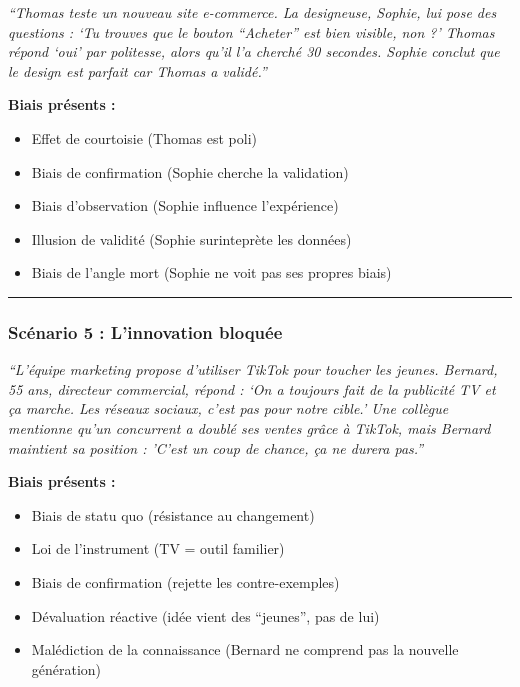 \documentclass[
]{article}
\providecommand{\tightlist}{%
  \setlength{\itemsep}{0pt}\setlength{\parskip}{0pt}}
\begin{document}
\emph{``Thomas teste un nouveau site e-commerce. La designeuse, Sophie,
lui pose des questions : `Tu trouves que le bouton ``Acheter'' est bien
visible, non ?' Thomas répond `oui' par politesse, alors qu'il l'a
cherché 30 secondes. Sophie conclut que le design est parfait car Thomas
a validé.''}

\textbf{Biais présents :}

\begin{itemize}
\tightlist
\item
  Effet de courtoisie (Thomas est poli)
\item
  Biais de confirmation (Sophie cherche la validation)
\item
  Biais d'observation (Sophie influence l'expérience)
\item
  Illusion de validité (Sophie surinteprète les données)
\item
  Biais de l'angle mort (Sophie ne voit pas ses propres biais)
\end{itemize}

\begin{center}\rule{0.5\linewidth}{0.5pt}\end{center}

\subsubsection{Scénario 5 : L'innovation
bloquée}\label{scuxe9nario-5-linnovation-bloquuxe9e}

\emph{``L'équipe marketing propose d'utiliser TikTok pour toucher les
jeunes. Bernard, 55 ans, directeur commercial, répond : `On a toujours
fait de la publicité TV et ça marche. Les réseaux sociaux, c'est pas
pour notre cible.' Une collègue mentionne qu'un concurrent a doublé ses
ventes grâce à TikTok, mais Bernard maintient sa position : 'C'est un
coup de chance, ça ne durera pas.''}

\textbf{Biais présents :}

\begin{itemize}
\tightlist
\item
  Biais de statu quo (résistance au changement)
\item
  Loi de l'instrument (TV = outil familier)
\item
  Biais de confirmation (rejette les contre-exemples)
\item
  Dévaluation réactive (idée vient des ``jeunes'', pas de lui)
\item
  Malédiction de la connaissance (Bernard ne comprend pas la nouvelle
  génération)
\end{itemize}
\end{document}
